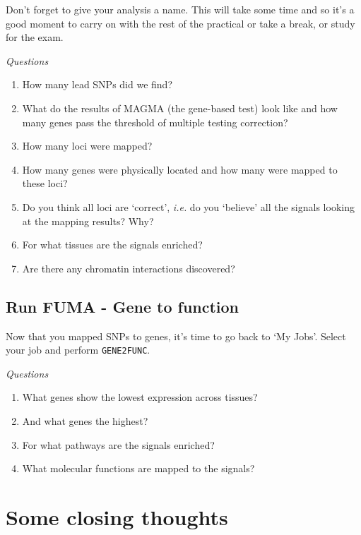 \documentclass[
]{book}
\providecommand{\tightlist}{%
  \setlength{\itemsep}{0pt}\setlength{\parskip}{0pt}}
\begin{document}
Don't forget to give your analysis a name. This will take some time and so it's a good moment to carry on with the rest of the practical or take a break, or study for the exam.

\emph{Questions}

\begin{enumerate}
\def\labelenumi{\arabic{enumi}.}
\tightlist
\item
  How many lead SNPs did we find?
\item
  What do the results of MAGMA (the gene-based test) look like and how many genes pass the threshold of multiple testing correction?
\item
  How many loci were mapped?
\item
  How many genes were physically located and how many were mapped to these loci?
\item
  Do you think all loci are `correct', \emph{i.e.} do you `believe' all the signals looking at the mapping results? Why?
\item
  For what tissues are the signals enriched?
\item
  Are there any chromatin interactions discovered?
\end{enumerate}

\hypertarget{run-fuma---gene-to-function}{%
\subsection{Run FUMA - Gene to function}\label{run-fuma---gene-to-function}}

Now that you mapped SNPs to genes, it's time to go back to `My Jobs'. Select your job and perform \texttt{GENE2FUNC}.

\emph{Questions}

\begin{enumerate}
\def\labelenumi{\arabic{enumi}.}
\tightlist
\item
  What genes show the lowest expression across tissues?
\item
  And what genes the highest?
\item
  For what pathways are the signals enriched?
\item
  What molecular functions are mapped to the signals?
\end{enumerate}

\hypertarget{some-closing-thoughts}{%
\section{Some closing thoughts}\label{some-closing-thoughts}}
\end{document}
